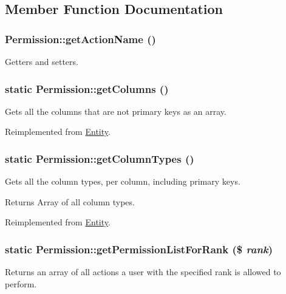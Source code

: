 \subsection{Member Function Documentation}
\hypertarget{classPermission_a0c1a23daf6f499100c92dcbbcef05416}{
\subsubsection[{getActionName}]{\setlength{\rightskip}{0pt plus 5cm}Permission::getActionName ()}}
\label{classPermission_a0c1a23daf6f499100c92dcbbcef05416}
Getters and setters. \hypertarget{classPermission_ac2a9a31fc731c58daa3b0b9385ec03fb}{
\subsubsection[{getColumns}]{\setlength{\rightskip}{0pt plus 5cm}static Permission::getColumns ()}}
\label{classPermission_ac2a9a31fc731c58daa3b0b9385ec03fb}
Gets all the columns that are not primary keys as an array. 

Reimplemented from \hyperlink{classEntity_a394717a08ffd54ec9a14d06727c86719}{Entity}.

\hypertarget{classPermission_a0040cda21f71bbcdf478c9e8f1996d6d}{
\subsubsection[{getColumnTypes}]{\setlength{\rightskip}{0pt plus 5cm}static Permission::getColumnTypes ()}}
\label{classPermission_a0040cda21f71bbcdf478c9e8f1996d6d}
Gets all the column types, per column, including primary keys.

\begin{DoxyReturn}{Returns}
Array of all column types. 
\end{DoxyReturn}


Reimplemented from \hyperlink{classEntity_ad69437219c10955803707fbf6ac458e7}{Entity}.

\hypertarget{classPermission_abcffffde78f2430545cdbe63369928b9}{
\subsubsection[{getPermissionListForRank}]{\setlength{\rightskip}{0pt plus 5cm}static Permission::getPermissionListForRank (\$ {\em rank})}}
\label{classPermission_abcffffde78f2430545cdbe63369928b9}
Returns an array of all actions a user with the specified rank is allowed to perform.


